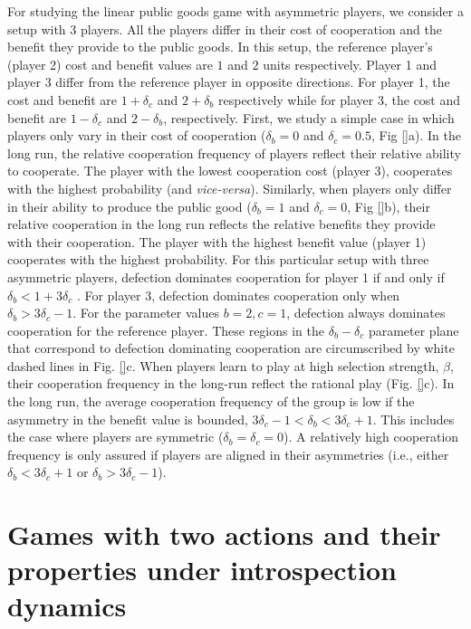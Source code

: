 \documentclass[11pt]{article}
\theoremstyle{plainCl1}
\theoremstyle{plainCl2}
\begin{document}
\noindent 
For studying the linear public goods game with asymmetric players, we consider a setup with 3 players. All the players differ in their cost of cooperation and the benefit they provide to the public goods. In this setup, the reference player's (player 2) cost and benefit values are $1$ and $2$ units respectively. Player 1 and player 3 differ from the reference player in opposite directions. For player 1, the cost and benefit are $1 + \delta_c$ and $2 + \delta_b$ respectively while for player 3, the cost and benefit are $1 - \delta_c$ and $2 - \delta_b$, respectively. First, we study a simple case in which players only vary in their cost of cooperation ($\delta_b = 0$ and $\delta_c = 0.5$, Fig \ref{}a). In the long run, the relative cooperation frequency of players reflect their relative ability to cooperate. The player with the lowest cooperation cost (player 3), cooperates with the highest probability (and \emph{vice-versa}). Similarly, when players only differ in their ability to produce the public good ($\delta_b = 1$ and $\delta_c = 0$, Fig \ref{}b), their relative cooperation in the long run reflects the relative benefits they provide with their cooperation. The player with the highest benefit value (player 1) cooperates with the highest probability. For this particular setup with three asymmetric players, defection dominates cooperation for player 1 if and only if $\delta_b < 1 + 3\delta_c$ . For player 3, defection dominates cooperation only when $\delta_b > 3\delta_c - 1$. For the parameter values $b = 2, c = 1$, defection always dominates cooperation for the reference player. These regions in the $\delta_b-\delta_c$ parameter plane that correspond to defection dominating cooperation are circumscribed by white dashed lines in Fig. \ref{}c. When players learn to play at high selection strength, $\beta$, their cooperation frequency in the long-run reflect the rational play (Fig. \ref{}c). In the long run, the average cooperation frequency of the group is low if the asymmetry in the benefit value is bounded, $3\delta_c - 1 < \delta_b < 3\delta_c + 1$. This includes the case where players are symmetric ($\delta_b = \delta_c = 0$). A relatively high cooperation frequency is only assured if players are aligned in their asymmetries (i.e., either $\delta_b < 3\delta_c +1$ or $\delta_b > 3\delta_c - 1$).

\section*{Games with two actions and their properties under introspection dynamics}
\end{document}
